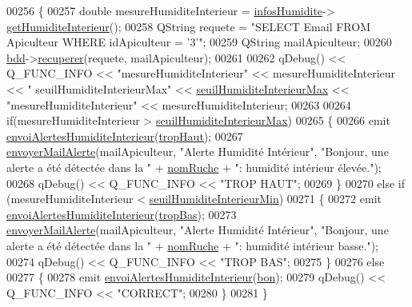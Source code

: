 \begin{DoxyCode}
00256 \{
00257     \textcolor{keywordtype}{double} mesureHumiditeInterieur = \hyperlink{class_alertes_a7b6d798ca0629b474120cd55eb8b510c}{infosHumidite}->
      \hyperlink{class_infos_humidite_a652f7ca3e4b97352034fed62c6d865b7}{getHumiditeInterieur}();
00258     QString requete = \textcolor{stringliteral}{"SELECT Email FROM Apiculteur WHERE idApiculteur = '3'"};
00259     QString mailApiculteur;
00260     \hyperlink{class_alertes_a91e58b69d29922e8e984efb767ae5268}{bdd}->\hyperlink{class_base_de_donnees_a77539baad389f5acf754cd2cd452403e}{recuperer}(requete, mailApiculteur);
00261 
00262     qDebug() << Q\_FUNC\_INFO << \textcolor{stringliteral}{"mesureHumiditeInterieur"} << mesureHumiditeInterieur << \textcolor{stringliteral}{"
      seuilHumiditeInterieurMax"} << \hyperlink{class_alertes_a795cd3721854335f6c91e6009b324c37}{seuilHumiditeInterieurMax} << \textcolor{stringliteral}{"mesureHumiditeInterieur"} << 
      mesureHumiditeInterieur;
00263 
00264     \textcolor{keywordflow}{if}(mesureHumiditeInterieur > \hyperlink{class_alertes_a795cd3721854335f6c91e6009b324c37}{seuilHumiditeInterieurMax})
00265     \{
00266         emit \hyperlink{class_alertes_a6d96d5a6e5a1e3c518c45e295a5b4ddf}{envoiAlertesHumiditeInterieur}(\hyperlink{parametres_8h_aaa6de8207c94675264c90b10b613368dabc650d9700ae19f2696e6a6e3f9ab067}{tropHaut});
00267         \hyperlink{class_alertes_a375783502a78109f3323dc1ed90cfdc9}{envoyerMailAlerte}(mailApiculteur, \textcolor{stringliteral}{"Alerte Humidité Intérieur"}, \textcolor{stringliteral}{"Bonjour, une
       alerte a été détectée dans la "} + \hyperlink{class_alertes_a212f2a7185bcc7b11f3e54200272bdcf}{nomRuche} + \textcolor{stringliteral}{": humidité intérieur élevée."});
00268         qDebug() << Q\_FUNC\_INFO << \textcolor{stringliteral}{"TROP HAUT"};
00269     \}
00270     \textcolor{keywordflow}{else} \textcolor{keywordflow}{if} (mesureHumiditeInterieur < \hyperlink{class_alertes_a501773587c8f2ccd032fe7db9af1f4e2}{seuilHumiditeInterieurMin})
00271     \{
00272         emit \hyperlink{class_alertes_a6d96d5a6e5a1e3c518c45e295a5b4ddf}{envoiAlertesHumiditeInterieur}(\hyperlink{parametres_8h_aaa6de8207c94675264c90b10b613368da4257e2f8921856770c8266f55c937295}{tropBas});
00273         \hyperlink{class_alertes_a375783502a78109f3323dc1ed90cfdc9}{envoyerMailAlerte}(mailApiculteur, \textcolor{stringliteral}{"Alerte Humidité Intérieur"}, \textcolor{stringliteral}{"Bonjour, une
       alerte a été détectée dans la "}  + \hyperlink{class_alertes_a212f2a7185bcc7b11f3e54200272bdcf}{nomRuche} +  \textcolor{stringliteral}{": humidité intérieur basse."});
00274         qDebug() << Q\_FUNC\_INFO << \textcolor{stringliteral}{"TROP BAS"};
00275     \}
00276     \textcolor{keywordflow}{else}
00277     \{
00278         emit \hyperlink{class_alertes_a6d96d5a6e5a1e3c518c45e295a5b4ddf}{envoiAlertesHumiditeInterieur}(\hyperlink{parametres_8h_aaa6de8207c94675264c90b10b613368da5ac8ec3b54d90a07c6bb5a77ef971821}{bon});
00279         qDebug() << Q\_FUNC\_INFO << \textcolor{stringliteral}{"CORRECT"};
00280     \}
00281 \}
\end{DoxyCode}
